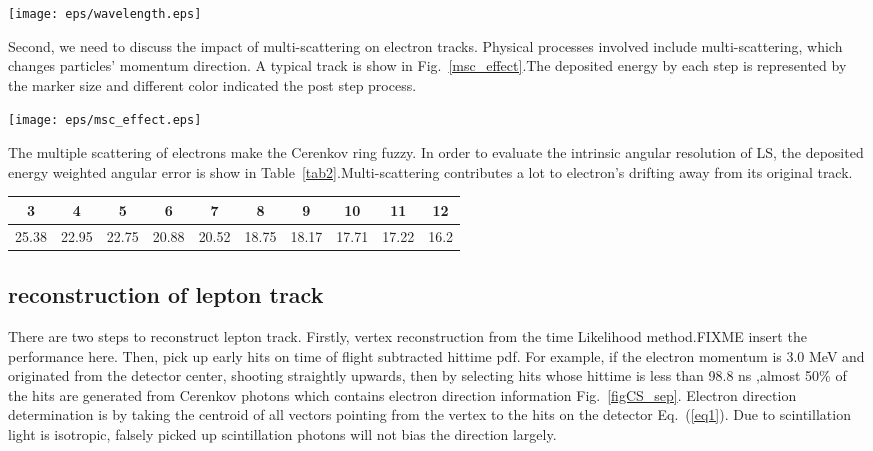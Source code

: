 \documentclass[a4paper,10pt]{cpc-hepnp}
\begin{document}
\begin{center}
\texttt{[image: eps/wavelength.eps]}
\end{center}
Second, we need to discuss the impact of multi-scattering on electron tracks.
Physical processes involved include multi-scattering, which changes
particles' momentum direction. A typical track is show in
Fig.~\ref{msc_effect}.The deposited energy by each step is
represented by the marker size and different color indicated the post step
process.
\begin{center}
\texttt{[image: eps/msc\_effect.eps]}
\end{center}

The multiple scattering of electrons make the Cerenkov ring fuzzy. In order to
evaluate the intrinsic angular resolution of LS, the deposited energy weighted
angular error is show in Table~\ref{tab2}.Multi-scattering
contributes a lot to electron's drifting away from its original track.

\begin{center}
\footnotesize
\begin{tabular*}{170mm}{@{\extracolsep{\fill}}cccccccccc}
\toprule 3&4&5&6&7&8&9&10&11&12\\
\hline
25.38&22.95&22.75&20.88&20.52&18.75&18.17&17.71&17.22&16.2\\
\bottomrule
\end{tabular*}
\end{center}




\subsection{reconstruction of lepton track}
There are two steps to reconstruct lepton track.
Firstly, vertex reconstruction from the time Likelihood method.FIXME insert
the performance here.
Then, pick up early hits on time of flight subtracted hittime pdf. For
example, if the electron momentum is 3.0 MeV and originated
from the detector center, shooting straightly upwards, then by selecting hits whose hittime is less than 98.8 ns ,almost 50\% of
the hits are generated from Cerenkov photons which contains electron direction information Fig.~\ref{figCS_sep}.
Electron direction determination is by taking the centroid of all vectors pointing from  the vertex to the hits on the
detector Eq.~(\ref{eq1}). Due to scintillation light is isotropic, falsely
picked up scintillation photons will not bias the direction largely.
\end{document}
